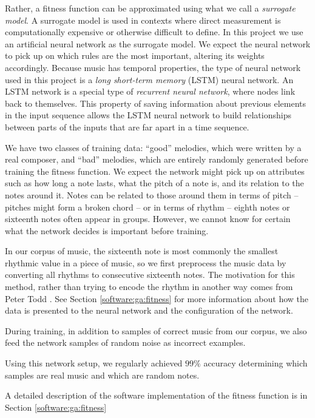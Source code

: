 Rather, a fitness function can be approximated using what we call a \textit{surrogate model}. %
A surrogate model is used in contexts where direct measurement is computationally expensive or otherwise difficult to define.
In this project we use an artificial neural network as the surrogate model.
We expect the neural network to pick up on which rules are the most important, altering its weights accordingly.
Because music has temporal properties, the type of neural network used in this project is a \textit{long short-term memory} (LSTM) neural network.
An LSTM network is a special type of \textit{recurrent neural network}, where nodes link back to themselves.
This property of saving information about previous elements in the input sequence allows the LSTM neural network to build relationships between parts of the inputs that are far apart in a time sequence.

We have two classes of training data: ``good'' melodies, which were written by a real composer, and ``bad'' melodies, which are entirely randomly generated before training the fitness function.
We expect the network might pick up on attributes such as how long a note lasts, what the pitch of a note is, and its relation to the notes around it.
Notes can be related to those around them in terms of pitch -- pitches might form a broken chord -- or in terms of rhythm -- eighth notes or sixteenth notes often appear in groups.
However, we cannot know for certain what the network decides is important before training.

In our corpus of music, the sixteenth note is most commonly the smallest rhythmic value in a piece of music, so we first preprocess the music data by converting all rhythms to consecutive sixteenth notes.
The motivation for this method, rather than trying to encode the rhythm in another way comes from Peter Todd \cite{todd_connectionist_1989}.
See Section \ref{software:ga:fitness} for more information about how the data is presented to the neural network and the configuration of the network.

During training, in addition to samples of correct music from our corpus, we also feed the network samples of random noise as incorrect examples.

Using this network setup, we regularly achieved $99\%$ accuracy determining which samples are real music and which are random notes.

A detailed description of the software implementation of the fitness function is in Section \ref{software:ga:fitness}

